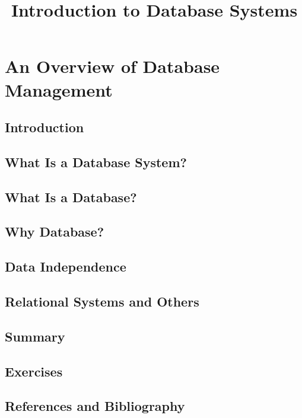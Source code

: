 \documentclass{book}
\begin{document}
\title{Introduction to Database Systems}
\maketitle

\tableofcontents

\chapter{An Overview of Database Management}

\section{Introduction}

\section{What Is a Database System? }

\section{What Is a Database?}

\section{Why Database?}

\section{Data Independence}

\section{Relational Systems and Others }

\section{Summary}

\section{Exercises}

\section{References and Bibliography}
\end{document}
